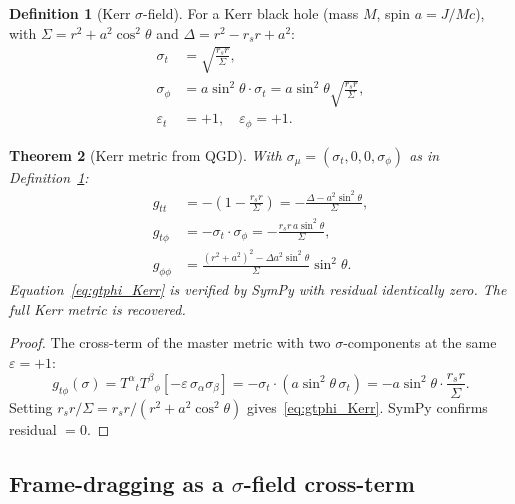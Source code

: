 \documentclass[11pt,a4paper]{article}
\theoremstyle{plain}
\newtheorem{theorem}{Theorem}[section]
\theoremstyle{definition}
\newtheorem{definition}[theorem]{Definition}
\theoremstyle{remark}
\begin{document}
\begin{definition}[Kerr $\sigma$-field]\label{def:Kerr}
For a Kerr black hole (mass $M$, spin $a=J/Mc$),
with $\Sigma = r^2+a^2\cos^2\theta$ and $\Delta = r^2-r_sr+a^2$:
\begin{align}
  \sigma_t &= \sqrt{\frac{r_s r}{\Sigma}},
  \label{eq:sigma_t_kerr}\\
  \sigma_\phi &= a\sin^2\!\theta\cdot\sigma_t
    = a\sin^2\!\theta\sqrt{\frac{r_s r}{\Sigma}},
  \label{eq:sigma_phi_kerr}\\
  \varepsilon_t &= +1,\quad \varepsilon_\phi = +1.
  \label{eq:eps_kerr}
\end{align}
\end{definition}

\begin{theorem}[Kerr metric from QGD]\label{thm:Kerr}
With $\sigma_\mu = (\sigma_t,0,0,\sigma_\phi)$ as in Definition~\ref{def:Kerr}:
\begin{align}
  g_{tt} &= -\!\left(1 - \frac{r_s r}{\Sigma}\right)
    = -\frac{\Delta-a^2\sin^2\!\theta}{\Sigma},
  \label{eq:gtt_Kerr}\\
  g_{t\phi} &= -\sigma_t\cdot\sigma_\phi
    = -\frac{r_s r\,a\sin^2\!\theta}{\Sigma},
  \label{eq:gtphi_Kerr}\\
  g_{\phi\phi} &= \frac{(r^2+a^2)^2-\Delta a^2\sin^2\!\theta}{\Sigma}\sin^2\!\theta.
  \label{eq:gpp_Kerr}
\end{align}
Equation~\eqref{eq:gtphi_Kerr} is verified by SymPy with residual identically zero.
The full Kerr metric is recovered.
\end{theorem}

\begin{proof}
The cross-term of the master metric with two $\sigma$-components at the same
$\varepsilon = +1$:
\begin{equation}
  g_{t\phi}(\sigma) = T^\alpha{}_t T^\beta{}_\phi\!\left[-\varepsilon\,
    \sigma_\alpha\sigma_\beta\right]
  = -\sigma_t\cdot(a\sin^2\!\theta\,\sigma_t)
  = -a\sin^2\!\theta\cdot\frac{r_s r}{\Sigma}.
\end{equation}
Setting $r_s r/\Sigma = r_s r/(r^2+a^2\cos^2\!\theta)$ gives~\eqref{eq:gtphi_Kerr}.
SymPy confirms residual $= 0$.
\end{proof}

\subsection{Frame-dragging as a $\sigma$-field cross-term}
\end{document}
